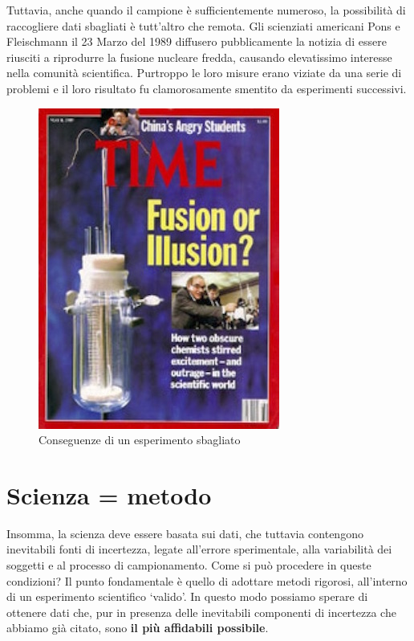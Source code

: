\documentclass[a4paper,12pt,oneside]{book}
\begin{document}
Tuttavia, anche quando il campione è sufficientemente numeroso, la possibilità di raccogliere dati sbagliati è tutt'altro che remota. Gli scienziati americani Pons e Fleischmann il 23 Marzo del 1989 diffusero pubblicamente la notizia di essere riusciti a riprodurre la fusione nucleare fredda, causando elevatissimo interesse nella comunità scientifica. Purtroppo le loro misure erano viziate da una serie di problemi e il loro risultato fu clamorosamente smentito da esperimenti successivi.

\begin{figure}

{\centering \includegraphics[width=0.5\linewidth]{_images/FalseResults} 

}

\caption{Conseguenze di un esperimento sbagliato}\label{fig:figName2}
\end{figure}

\hypertarget{scienza-metodo}{%
\section{Scienza = metodo}\label{scienza-metodo}}

Insomma, la scienza deve essere basata sui dati, che tuttavia contengono inevitabili fonti di incertezza, legate all'errore sperimentale, alla variabilità dei soggetti e al processo di campionamento. Come si può procedere in queste condizioni? Il punto fondamentale è quello di adottare metodi rigorosi, all'interno di un esperimento scientifico `valido'. In questo modo possiamo sperare di ottenere dati che, pur in presenza delle inevitabili componenti di incertezza che abbiamo già citato, sono \textbf{il più affidabili possibile}.
\end{document}
